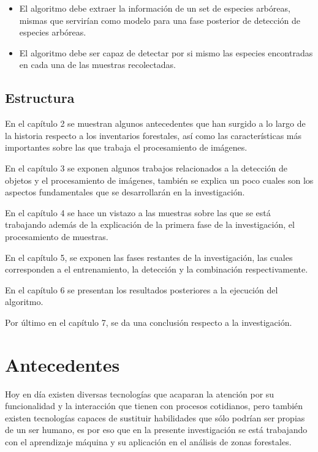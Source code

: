 \begin{itemize}
\item El algoritmo debe extraer la información de un set de especies arbóreas, mismas que servirían como modelo para una fase posterior de detección de especies arbóreas.
\end{itemize}

\begin{itemize}
\item El algoritmo debe ser capaz de detectar por si mismo las especies encontradas en cada una de las muestras recolectadas.
\end{itemize}

\pagebreak

\section{Estructura}
En el capítulo 2 se muestran algunos antecedentes que han surgido a lo largo
de la historia respecto a los inventarios forestales, así como las características más importantes sobre las que trabaja el procesamiento de imágenes.

En el capítulo 3 se exponen algunos trabajos relacionados a la detección de
objetos y el procesamiento de imágenes, también se explica un poco cuales son los aspectos fundamentales que se desarrollarán en la investigación.

En el capítulo 4 se hace un vistazo a las muestras sobre las que se está trabajando además de la explicación de la primera fase de la investigación, el procesamiento de muestras.

En el capítulo 5, se exponen las fases restantes de la investigación, las cuales corresponden a el entrenamiento, la detección y la combinación respectivamente.

En el capítulo 6 se presentan los resultados posteriores a la ejecución del algoritmo.

Por último en el capítulo 7, se da una conclusión respecto a la investigación.

\chapter{Antecedentes}
Hoy en día existen diversas tecnologías que acaparan la atención por su funcionalidad y la interacción que tienen con procesos cotidianos, pero también existen tecnologías capaces de sustituir habilidades que sólo podrían ser propias de un ser humano, es por eso que en la presente investigación se está trabajando con el aprendizaje máquina y su aplicación en el análisis de zonas forestales.

